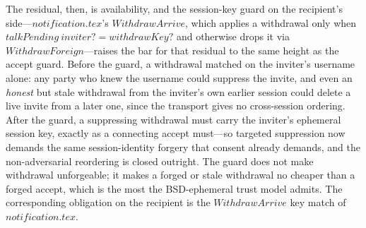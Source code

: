 \documentclass[a4paper,10pt,fleqn]{article}
\begin{document}
The residual, then, is availability, and the session-key guard on the
recipient's side---$notification.tex$'s $WithdrawArrive$, which applies a
withdrawal only when $talkPending~inviter? = withdrawKey?$ and otherwise drops
it via $WithdrawForeign$---raises the bar for that residual to the same height
as the accept guard.  Before the guard, a withdrawal matched on the inviter's
username alone: any party who knew the username could suppress the invite, and
even an \emph{honest} but stale withdrawal from the inviter's own earlier
session could delete a live invite from a later one, since the transport gives
no cross-session ordering.  After the guard, a suppressing withdrawal must
carry the inviter's ephemeral session key, exactly as a connecting accept
must---so targeted suppression now demands the same session-identity forgery
that consent already demands, and the non-adversarial reordering is closed
outright.  The guard does not make withdrawal unforgeable; it makes a forged
or stale withdrawal no cheaper than a forged accept, which is the most the
BSD-ephemeral trust model admits.  The corresponding obligation on the
recipient is the $WithdrawArrive$ key match of $notification.tex$.
\end{document}
